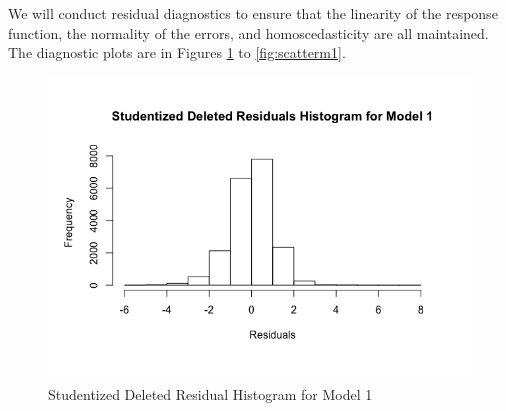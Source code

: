 \documentclass{article}
\begin{document}
      We will conduct residual diagnostics to ensure that the linearity of
      the response function, the normality of the errors, and homoscedasticity
      are all maintained. The diagnostic plots are in Figures \ref{fig:histm1}
      to \ref{fig:scatterm1}.

      \begin{figure}[H]
        \centering
        \begin{minipage}{.45\textwidth}
          \centering
          \includegraphics[scale=0.35]{selection/histm1}
          \caption{Studentized Deleted Residual Histogram for Model 1}
          \label{fig:histm1}


\end{minipage}
\end{figure}
\end{document}
